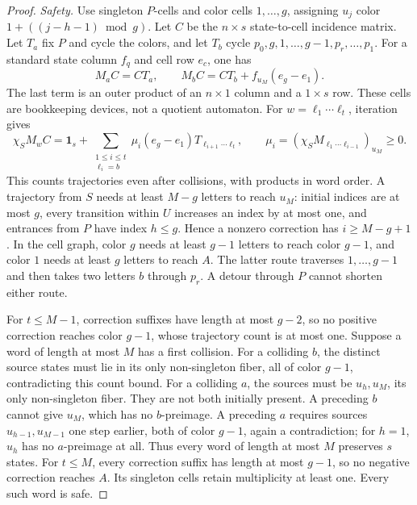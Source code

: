 \documentclass[11pt]{article}
\theoremstyle{definition}
\theoremstyle{plain}
\newcommand{\one}{\mathbf 1}
\begin{document}
\begin{proof}
\emph{Safety.}
Use singleton $P$-cells and color cells $1,\ldots,g$, assigning
$u_j$ color $1+((j-h-1)\bmod g)$.
Let $C$ be the $n\times s$ state-to-cell incidence matrix.
Let $T_a$ fix $P$ and cycle the colors, and let $T_b$ cycle
$p_0,g,1,\ldots,g-1,p_r,\ldots,p_1$.
For a standard state column $f_q$ and cell row $e_c$, one has
\begin{equation}\label{eq:error}
 M_aC=CT_a,\qquad M_bC=CT_b+f_{u_M}(e_g-e_1).
\end{equation}
The last term is an outer product of an $n\times1$ column and a $1\times s$ row.
These cells are bookkeeping devices, not a quotient automaton.
For $w=\ell_1\cdots\ell_t$, iteration gives
\begin{equation}\label{eq:expand}
 \chi_SM_wC=\one_s+
 \sum_{\substack{1\le i\le t\\\ell_i=b}}
 \mu_i(e_g-e_1)T_{\ell_{i+1}\cdots\ell_t},
 \qquad \mu_i=(\chi_SM_{\ell_1\cdots\ell_{i-1}})_{u_M}\ge0.
\end{equation}
This counts trajectories even after collisions, with products in word order.
A trajectory from $S$ needs at least $M-g$ letters to reach $u_M$:
initial indices are at most $g$, every transition within $U$ increases an
index by at most one, and entrances from $P$ have index $h\le g$.
Hence a nonzero correction has $i\ge M-g+1$.
In the cell graph, color $g$ needs at least $g-1$ letters to reach color $g-1$,
and color $1$ needs at least $g$ letters to reach $A$.
The latter route traverses $1,\ldots,g-1$ and then takes two letters $b$
through $p_r$. A detour through $P$ cannot shorten either route.

For $t\le M-1$, correction suffixes have length at most $g-2$,
so no positive correction reaches color $g-1$, whose trajectory count is at most one.
Suppose a word of length at most $M$ has a first collision.
For a colliding $b$, the distinct source states must lie in its only
non-singleton fiber, all of color $g-1$, contradicting this count bound.
For a colliding $a$, the sources must be $u_h,u_M$, its only non-singleton fiber.
They are not both initially present. A preceding $b$ cannot give $u_M$,
which has no $b$-preimage. A preceding $a$ requires sources
$u_{h-1},u_{M-1}$ one step earlier, both of color $g-1$, again a contradiction;
for $h=1$, $u_h$ has no $a$-preimage at all.
Thus every word of length at most $M$ preserves $s$ states.
For $t\le M$, every correction suffix has length at most $g-1$,
so no negative correction reaches $A$. Its singleton cells retain multiplicity
at least one. Every such word is safe.


\end{proof}
\end{document}
